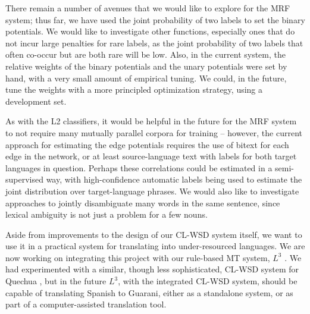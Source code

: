 \documentclass[11pt,letterpaper]{article}
\begin{document}
There remain a number of avenues that we would like to explore for the MRF
system; thus far, we have used the joint probability of two labels to set the
binary potentials. We would like to investigate other functions, especially
ones that do not incur large penalties for rare labels, as the joint
probability of two labels that often co-occur but are both rare will be low.
Also, in the current system, the relative weights of the binary potentials and
the unary potentials were set by hand, with a very small amount of empirical
tuning. We could, in the future, tune the weights with a more principled
optimization strategy, using a development set.


As with the L2 classifiers, it would be helpful in the future for the
MRF system to not require many mutually parallel corpora for training --
however, the current approach for estimating the edge potentials requires the
use of bitext for each edge in the network, or at least source-language text
with labels for both target languages in question. Perhaps these correlations
could be estimated in a semi-supervised way, with high-confidence automatic
labels being used to estimate the joint distribution over target-language
phrases.  We would also like to investigate approaches to jointly disambiguate
many words in the same sentence, since lexical ambiguity is not just a problem
for a few nouns.

Aside from improvements to the design of our CL-WSD system itself, we want to
use it in a practical system for translating into under-resourced languages.
We are now working on integrating this project with our rule-based MT system,
$L^3$ \cite{gasser:aflat2012}. We had experimented with a similar, though less
sophisticated, CL-WSD system for Quechua \cite{rudnick:2011:RANLPStud}, but in
the future $L^3$, with the integrated CL-WSD system, should be capable of
translating Spanish to Guarani, either as a standalone system, or as part of a
computer-assisted translation tool.



{}
\end{document}
